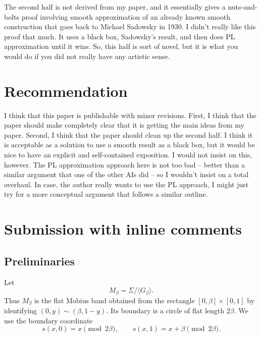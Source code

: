 \documentclass[12pt]{article}
\begin{document}
The second half is not derived from my paper, and it essentially gives a nuts-and-bolts proof involving smooth approximation of an already known smooth construction that goes back to Michael Sadowsky in 1930.  I didn't really like this proof that much. It uses a black box, Sadowsky's result, and then 
does PL approximation until it wins.  So, this half is sort of novel, but it is what you would do if you did not really have any artistic sense.


\section{Recommendation}

I think that this paper is publishable with minor revisions.
First, I think that the paper should make completely clear
that it is getting the main ideas from my paper.  Second, I
think that the paper should clean up the second half. I think
it is acceptable as a solution to use a smooth result as a
black box, but it would be nice to have an explicit and
self-contained exposition.  I would not insist on this, however. The PL approximation approach here
is not too bad -- better than a similar argument that one of the other AIs did -- so
I wouldn't insist on a total overhaul. In case, the author really wants to use the PL approach, I might just try for a
more conceptual argument that follows a similar outline.



  \section{Submission with inline comments}


\date{}


\begin{abstract}
We prove the stronger statement that a number \(\beta>0\) is realized in the sense of the question if and only if \(\beta>\sqrt 3\).  Hence the infimum of the set of realized numbers is \(\sqrt 3\).
\end{abstract}

\subsection{Preliminaries}

Let
\[
M_\beta=\Sigma/\langle G_\beta\rangle .
\]
Thus \(M_\beta\) is the flat Mobius band obtained from the rectangle
\([0,\beta]\times[0,1]\) by identifying \((0,y)\sim(\beta,1-y)\).  Its boundary is a circle of flat length \(2\beta\).  We use the boundary coordinate
\[
s(x,0)=x\pmod {2\beta},\qquad s(x,1)=x+\beta\pmod {2\beta}.
\]
\end{document}
